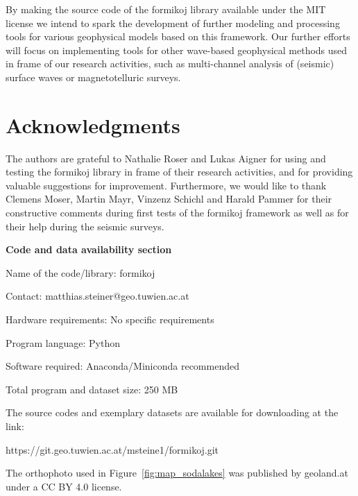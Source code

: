 \documentclass[a4paper,fleqn]{cas-sc}
\begin{document}
By making the source code of the formikoj library available under the MIT license we intend to spark the development of further modeling and processing tools for various geophysical models based on this framework. Our further efforts will focus on implementing tools for other wave-based geophysical methods used in frame of our research activities, such as multi-channel analysis of (seismic) surface waves or magnetotelluric surveys. 

\section{Acknowledgments}

The authors are grateful to Nathalie Roser and Lukas Aigner for using and testing the formikoj library in frame of their research activities, and for providing valuable suggestions for improvement. Furthermore, we would like to thank Clemens Moser, Martin Mayr, Vinzenz Schichl and Harald Pammer for their constructive comments during first tests of the formikoj framework as well as for their help during the seismic surveys.

\newpage

\textbf{Code and data availability section}

Name of the code/library: formikoj

Contact: matthias.steiner@geo.tuwien.ac.at

Hardware requirements: No specific requirements

Program language: Python
 
Software required: Anaconda/Miniconda recommended

Total program and dataset size: 250 MB

The source codes and exemplary datasets are available for downloading at the link:

https://git.geo.tuwien.ac.at/msteine1/formikoj.git

The orthophoto used in Figure~\ref{fig:map_sodalakes} was published by geoland.at under a CC BY 4.0 license.

\appendix
\end{document}
